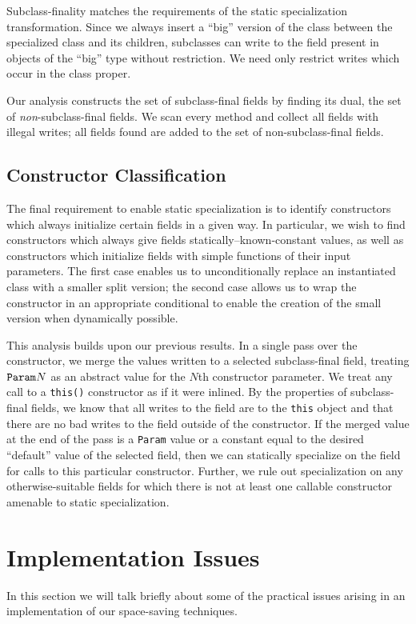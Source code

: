 \documentclass{sig-alt-full}
\begin{document}
Subclass-finality matches the requirements of the static
specialization transformation.  Since we always insert a ``big''
version of the class between the specialized class and its children,
subclasses can write to the field present in objects of the ``big'' type
without restriction.
We need only restrict writes which occur in the class proper.

Our analysis constructs the set of subclass-final fields by finding
its dual, the set of {\it non}-subclass-final fields.  We scan every
method and collect all fields with illegal writes; all
fields found are added to the set of non-subclass-final fields.

\subsection{Constructor Classification}
The final requirement to enable static specialization is to identify
constructors which always initialize certain fields in a given way.
In particular, we wish to find constructors which always give fields
statically--known-constant values, as well as constructors which
initialize fields with simple functions of their input parameters.
The first case enables us to unconditionally replace an instantiated
class with a smaller split version; the second case allows us to wrap
the constructor in an appropriate conditional to enable the creation
of the small version when dynamically possible.

This analysis builds upon our previous results.
In a single pass over the constructor, we merge the values written
to a selected subclass-final field, treating $\text{\tt Param}N$ as an
abstract value for the $N$th constructor parameter.
We treat any call to a {\tt this()}
constructor as if it were inlined.  By the properties of
subclass-final fields, we know that all writes to the
field are to the {\tt this} object and that there are no bad writes to
the field outside of the constructor.
If the merged value at the end of the pass 
is a {\tt Param} value or a constant equal to the desired ``default''
value of the selected field,
then we can statically specialize on the field for calls to this
particular constructor.
Further, we rule out specialization on any otherwise-suitable
fields for which there is not at least one callable constructor
amenable to static specialization.
%
\section{Implementation Issues}
%
In this section we will talk briefly about some of the practical
issues arising in an implementation of our space-saving techniques.
%
\end{document}
